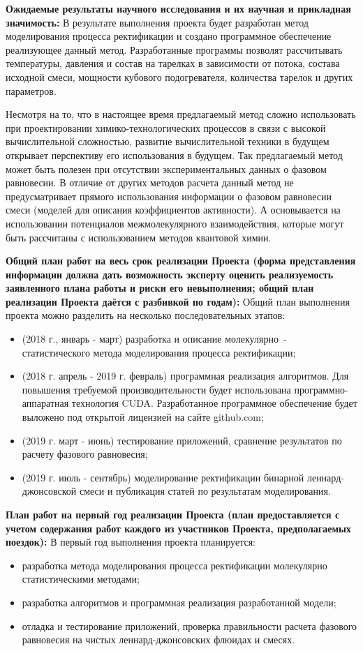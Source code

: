 \textbf{Ожидаемые результаты научного исследования и их научная и прикладная значимость:}
В результате выполнения проекта будет разработан метод моделирования процесса ректификации и создано программное обеспечение реализующее данный метод. Разработанные программы позволят рассчитывать температуры, давления и состав на тарелках в зависимости от потока, состава исходной смеси, мощности кубового подогревателя, количества тарелок и других параметров. 

Несмотря на то, что в настоящее время предлагаемый метод сложно использовать при проектировании химико-технологических процессов в связи с высокой вычислительной сложностью, развитие вычислительной техники в будущем открывает перспективу его использования в будущем. Так предлагаемый метод может быть полезен при отсутствии экспериментальных данных о фазовом равновесии. В отличие от других методов расчета данный метод не предусматривает прямого использования информации о фазовом равновесии смеси (моделей для описания коэффициентов активности). А основывается на использовании потенциалов межмолекулярного взаимодействия, которые могут быть рассчитаны с использованием методов квантовой химии. 

\textbf{Общий план работ на весь срок реализации Проекта (форма представления информации должна дать возможность эксперту оценить реализуемость заявленного плана работы и риски его невыполнения; общий план реализации Проекта даётся с разбивкой по годам):}
Общий план выполнения проекта можно разделить на несколько последовательных этапов:
\begin{itemize}
	\item (2018 г., январь - март) разработка и описание молекулярно~- статистического метода моделирования процесса ректификации;
	\item (2018 г. апрель - 2019 г. февраль) программная реализация алгоритмов. Для повышения требуемой производительности будет использована программно-аппаратная технология CUDA. Разработанное программное обеспечение будет выложено под открытой лицензией на сайте  github.com;
	\item (2019 г. март - июнь) тестирование приложений, сравнение результатов по расчету фазового равновесия;
	\item (2019 г. июль - сентябрь) моделирование ректификации бинарной леннард-джонсовской смеси и публикация статей по результатам моделирования. 
\end{itemize} 

\textbf{План работ на первый год реализации Проекта (план предоставляется с учетом содержания работ каждого из участников Проекта, предполагаемых поездок):}
В первый год выполнения проекта планируется:
\begin{itemize}
	\item разработка метода моделирования процесса ректификации молекулярно статистическими методами;
	\item разработка алгоритмов и программная реализация разработанной модели;
	\item отладка и тестирование приложений, проверка правильности расчета фазового равновесия на чистых леннард-джонсовских флюидах и смесях.
\end{itemize}

